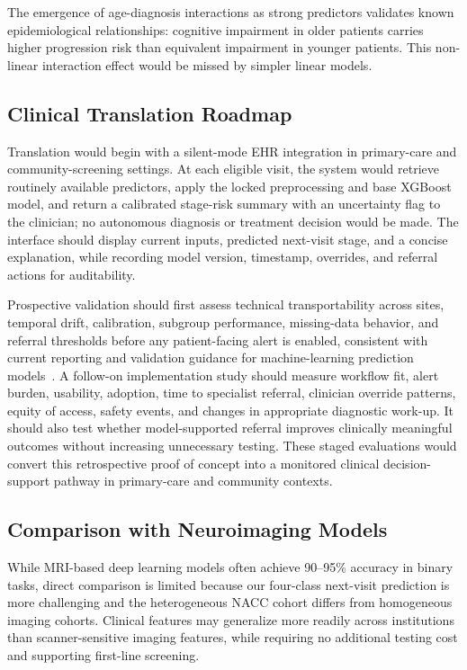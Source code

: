 \documentclass[preprint,12pt]{elsarticle}
\begin{document}
The emergence of age-diagnosis interactions as strong predictors validates known epidemiological relationships: cognitive impairment in older patients carries higher progression risk than equivalent impairment in younger patients. This non-linear interaction effect would be missed by simpler linear models.

\subsection{Clinical Translation Roadmap}

Translation would begin with a silent-mode EHR integration in primary-care and community-screening settings. At each eligible visit, the system would retrieve routinely available predictors, apply the locked preprocessing and base XGBoost model, and return a calibrated stage-risk summary with an uncertainty flag to the clinician; no autonomous diagnosis or treatment decision would be made. The interface should display current inputs, predicted next-visit stage, and a concise explanation, while recording model version, timestamp, overrides, and referral actions for auditability.

Prospective validation should first assess technical transportability across sites, temporal drift, calibration, subgroup performance, missing-data behavior, and referral thresholds before any patient-facing alert is enabled, consistent with current reporting and validation guidance for machine-learning prediction models~\cite{collins2024}. A follow-on implementation study should measure workflow fit, alert burden, usability, adoption, time to specialist referral, clinician override patterns, equity of access, safety events, and changes in appropriate diagnostic work-up. It should also test whether model-supported referral improves clinically meaningful outcomes without increasing unnecessary testing. These staged evaluations would convert this retrospective proof of concept into a monitored clinical decision-support pathway in primary-care and community contexts.

\subsection{Comparison with Neuroimaging Models}

While MRI-based deep learning models often achieve 90--95\% accuracy in binary tasks, direct comparison is limited because our four-class next-visit prediction is more challenging and the heterogeneous NACC cohort differs from homogeneous imaging cohorts. Clinical features may generalize more readily across institutions than scanner-sensitive imaging features, while requiring no additional testing cost and supporting first-line screening.
\end{document}
